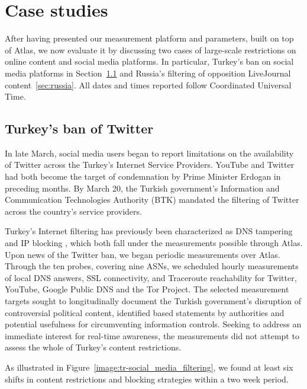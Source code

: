 \section{Case studies}
\label{sec:case_studies}

After having presented our measurement platform and parameters, built on top of
Atlas, we now evaluate it by discussing two cases of large-scale
restrictions on online content and social media platforms.  In particular, Turkey's ban on social media platforms in
Section~\ref{sec:turkey} and Russia's filtering of opposition LiveJournal content~\ref{sec:russia}. All dates and times reported follow Coordinated Universal Time.


\subsection{Turkey's ban of Twitter}
\label{sec:turkey}

In late March, social media users began to report limitations on the
availability of Twitter across the Turkey's Internet Service Providers.
YouTube and Twitter had both become the target of condemnation by Prime Minister
Erdogan in preceding months. By March 20, the Turkish government's Information
and Communication Technologies Authority (BTK) mandated the filtering of
Twitter across the country's service providers.

Turkey's Internet filtering has previously been characterized as DNS tampering and
IP blocking \cite{akdeniz2010report}, which both fall under the measurements
possible through Atlas.  Upon news of the Twitter ban, we began periodic
measurements over Atlas.  Through the ten probes, covering nine ASNs, we
scheduled hourly measurements of local DNS answers, SSL connectivity, and
Traceroute reachability for Twitter, YouTube, Google Public DNS and the Tor
Project.  The selected measurement targets sought to longitudinally
document the Turkish government's disruption of controversial political
content, identified based statements by authorities and potential usefulness for
circumventing information controls. Seeking to address an immediate interest for real-time
awareness, the measurements did not attempt to assess the whole of Turkey's content
restrictions.

As illustrated in Figure~\ref{image:tr-social_media_filtering}, we
found at least six shifts in content restrictions and blocking strategies
within a two week period.

